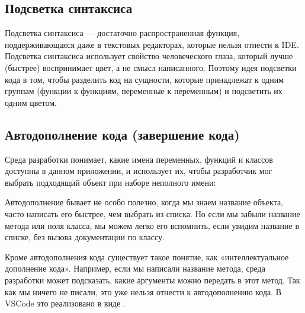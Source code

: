 \documentclass[letterpaper,10pt,russian]{sphinxmanual}
\begin{document}
\sphinxAtStartPar
{}


\subsection{Подсветка синтаксиса}
\label{\detokenize{educational_materials/ide/content:id2}}
\sphinxAtStartPar
Подсветка синтаксиса — достаточно распространенная функция, поддерживающаяся даже в текстовых редакторах, которые нельзя отнести к IDE. Подсветка синтаксиса использует свойство человеческого глаза, который лучше (быстрее) воспринимает цвет, а не смысл написанного. Поэтому идея подсветки кода в том, чтобы разделить код на сущности, которые принадлежат к одним группам (функции к функциям, переменные к переменным) и подсветить их одним цветом.

\sphinxAtStartPar
{}


\subsection{Автодополнение кода (завершение кода)}
\label{\detokenize{educational_materials/ide/content:id3}}
\sphinxAtStartPar
Среда разработки понимает, какие имена переменных, функций и классов доступны в данном приложении, и использует их, чтобы разработчик мог выбрать подходящий объект при наборе неполного имени:

\sphinxAtStartPar
{}

\sphinxAtStartPar
Автодополнение бывает не особо полезно, когда мы знаем название объекта, часто написать его быстрее, чем выбрать из списка. Но если мы забыли название метода или поля класса, мы можем легко его вспомнить, если увидим название в списке, без вызова документации по классу.

\sphinxAtStartPar
{}

\sphinxAtStartPar
Кроме автодополнения кода существует такое понятие, как «интеллектуальное дополнение кода». Например, если мы написали название метода, среда разработки может подсказать, какие аргументы можно передать в этот метод. Так как мы ничего не писали, это уже нельзя отнести к автодополнению кода. В VSCode это реализовано в виде .

\sphinxAtStartPar
{}
\end{document}
